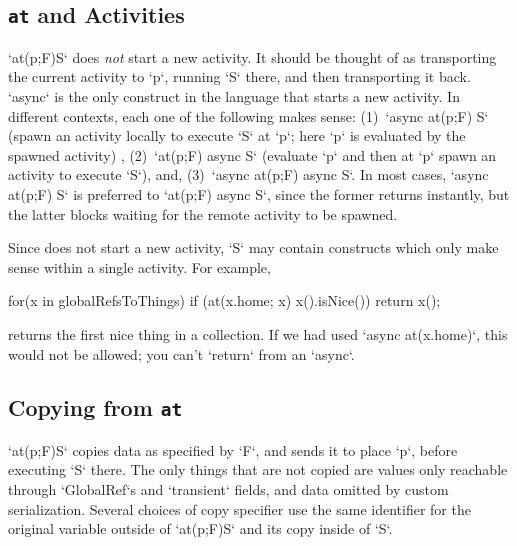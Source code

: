 \subsection{{\tt at} and Activities}
\xcd`at(p;F)S` does {\em not} start a new activity.  It should be thought of as
transporting the current activity to \xcd`p`, running \xcd`S` there, and then
transporting it back.  \xcd`async` is the only construct in the
language that starts a new activity. In different contexts, each one
of the following makes sense:
(1)~\xcd`async at(p;F) S` (spawn an activity locally to execute \xcd`S` at
\xcd`p`; here \xcd`p` is evaluated by the spawned activity) , 
(2)~\xcd`at(p;F) async S` (evaluate \xcd`p` and then at \xcd`p` spawn an
activity to execute \xcd`S`), and,
(3)~\xcd`async at(p;F) async S`. 
In most cases, \xcd`async at(p;F) S` is preferred to \xcd`at(p;F) async S`, since
the former returns instantly, but the latter blocks waiting for the remote
activity to be spawned. 

Since  does not start a new activity, 
\xcd`S` may contain constructs which only make sense
within a single activity.  
For example, 
\begin{xten}
    for(x in globalRefsToThings) 
      if (at(x.home; x) x().isNice()) 
        return x();
\end{xten}
returns the first nice thing in a collection.   If we had used 
\xcd`async at(x.home)`, this would not be allowed; 
you can't \xcd`return` from an
\xcd`async`. 




\subsection{Copying from {\tt at} }

\xcd`at(p;F)S` copies data as specified by \xcd`F`, and sends it
to place \xcd`p`, before executing \xcd`S` there. The only things that are not
copied are values only reachable through \xcd`GlobalRef`s and \xcd`transient`
fields, and data omitted by custom serialization.    
Several choices of copy specifier use the same identifier for the original
variable outside of \xcd`at(p;F)S` and its copy inside of \xcd`S`.  


